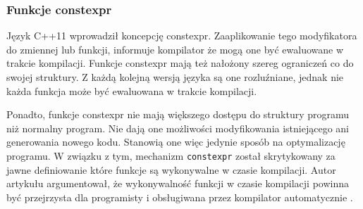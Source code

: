 \subsubsection{Funkcje constexpr}
Język C++11 wprowadził koncepcję constexpr. Zaaplikowanie tego modyfikatora do zmiennej lub funkcji, informuje kompilator że mogą one być ewaluowane w trakcie kompilacji. Funkcje constexpr mają też nałożony szereg ograniczeń co do swojej struktury. Z każdą kolejną wersją języka są one rozluźniane, jednak nie każda funkcja może być ewaluowana w trakcie kompilacji.

Ponadto, funkcje constexpr nie mają większego dostępu do struktury programu niż normalny program. Nie dają one możliwości modyfikowania istniejącego ani generowania nowego kodu. Stanowią one więc jedynie sposób na optymalizację programu.
W związku z tym, mechanizm \lstinline{constexpr} został skrytykowany za jawne definiowanie które funkcje są wykonywalne w czasie kompilacji.
Autor artykułu argumentował, że wykonywalność funkcji w czasie kompilacji powinna być przejrzysta dla programisty i obsługiwana przez kompilator automatycznie \cite{Klimiankou:contexpr_great_good_wrong_idea}.

